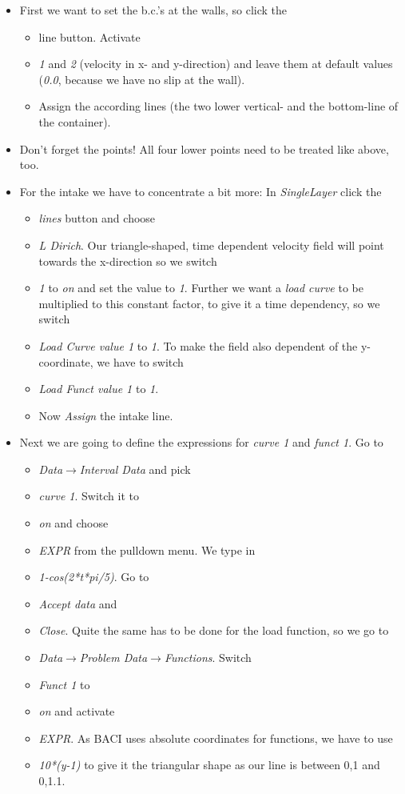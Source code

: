 \begin{itemize}
\item First we want to set the b.c.'s at the walls, so click the

\begin{itemize}
\item line button. Activate 
\item \emph{1} and \emph{2} (velocity in x- and y-direction) and leave them
at default values (\emph{0.0}, because we have no slip at the wall).
\item Assign the according lines (the two lower vertical- and the bottom-line
of the container). 
\end{itemize}
\item Don't forget the points! All four lower points need to be treated
like above, too.
\item For the intake we have to concentrate a bit more: In \emph{SingleLayer}
click the

\begin{itemize}
\item \emph{lines} button and choose 
\item \emph{L Dirich}. Our triangle-shaped, time dependent velocity field
will point towards the x-direction so we switch 
\item \emph{1} to \emph{on} and set the value to \emph{1}. Further we want
a \emph{load curve} to be multiplied to this constant factor, to give
it a time dependency, so we switch 
\item \emph{Load Curve value 1} to \emph{1}. To make the field also dependent
of the y-coordinate, we have to switch 
\item \emph{Load Funct value 1} to \emph{1}. 
\item Now \emph{Assign} the intake line.
\end{itemize}
\item Next we are going to define the expressions for \emph{curve 1} and
\emph{funct 1}. Go to 

\begin{itemize}
\item \emph{Data$\to$Interval Data} and pick
\item \emph{curve 1}. Switch it to 
\item \emph{on} and choose 
\item \emph{EXPR} from the pulldown menu. We type in 
\item \emph{1-cos(2{*}t{*}pi/5)}. Go to 
\item \emph{Accept data} and 
\item \emph{Close}. Quite the same has to be done for the load function,
so we go to 
\item \emph{Data$\to$Problem Data$\to$Functions}. Switch 
\item \emph{Funct 1} to 
\item \emph{on} and activate 
\item \emph{EXPR}. As BACI uses absolute coordinates for functions, we have
to use 
\item \emph{10{*}(y-1)} to give it the triangular shape as our line is between
0,1 and 0,1.1. 
\end{itemize}
\end{itemize}
